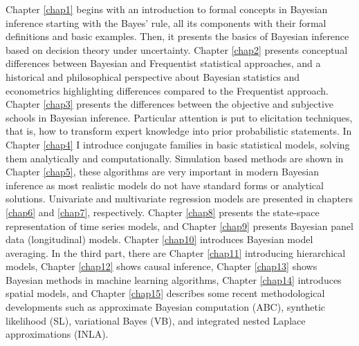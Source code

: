 Chapter \ref{chap1} begins with an introduction to formal concepts in Bayesian inference starting with the Bayes’ rule, all its components with their formal definitions and basic examples. Then, it presents the basics of Bayesian inference based on decision theory under uncertainty. Chapter \ref{chap2} presents conceptual differences between Bayesian and Frequentist statistical approaches, and a historical and philosophical perspective about Bayesian statistics and econometrics highlighting differences compared to the Frequentist approach. Chapter \ref{chap3} presents the differences between the objective and subjective schools in Bayesian inference. Particular attention is put to elicitation techniques, that is, how to transform expert knowledge into prior probabilistic statements. In Chapter \ref{chap4} I introduce conjugate families in basic statistical models, solving them analytically and computationally. Simulation based methods are shown in Chapter \ref{chap5}, these algorithms are very important in modern Bayesian inference as most realistic models do not have standard forms or analytical solutions. Univariate and multivariate regression models are presented in chapters \ref{chap6} and \ref{chap7}, respectively. Chapter \ref{chap8} presents the state-space representation of time series models, and Chapter \ref{chap9} presents Bayesian panel data (longitudinal) models. Chapter \ref{chap10} introduces Bayesian model averaging. In the third part, there are Chapter \ref{chap11} introducing hierarchical models, Chapter \ref{chap12} shows causal inference, Chapter \ref{chap13} shows Bayesian methods in machine learning algorithms, Chapter \ref{chap14} introduces spatial models, and Chapter \ref{chap15} describes some recent methodological developments such as approximate Bayesian computation (ABC), synthetic likelihood (SL), variational Bayes (VB), and integrated nested Laplace approximations (INLA).

